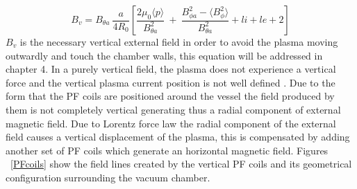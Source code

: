  \begin{equation}
 B_v=B_{\theta a} ~\frac{a}{4R_0}\left[ \frac{2\mu_0 \langle p \rangle }{ B_{\theta a}^2} ~+~\frac{ B_{\phi a}^2 - \langle B_{\phi}^2 \rangle }{B_{\theta a}^2 } +li+le+2 \right]
 \label{force_balance}
 \end{equation}
  $B_v$ is the necessary vertical external field in order to avoid the plasma moving outwardly and touch the chamber walls, this equation will be addressed in chapter 4. In a purely vertical field, the plasma does not experience a vertical force and the vertical plasma current position is not well defined \cite[Chapter~4]{Zohm2015}. Due to the form  that the PF coils are positioned around the vessel the field produced by them is not completely vertical generating thus a radial component of  external magnetic field.  Due to Lorentz force law  the radial component of the external field  causes a vertical displacement of the plasma, this is compensated by adding another set of PF coils which generate an horizontal magnetic field. Figures ~\ref{PFcoils} show the field lines created by the vertical PF coils and its geometrical configuration surrounding the vacuum chamber. \smallskip
  
